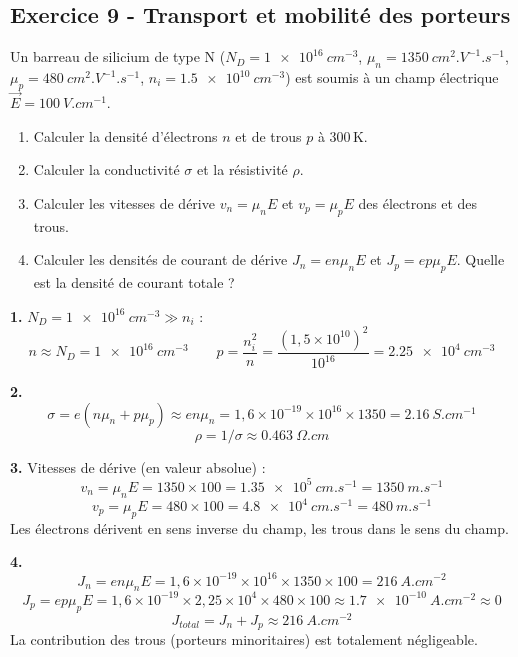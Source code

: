 \documentclass[12pt,a4paper]{article}
\begin{document}
\subsection*{Exercice 9 - Transport et mobilité des porteurs \niveau{\moyen}}

\begin{boiteexercice}
Un barreau de silicium de type N ($N_D = \qty{1e16}{cm^{-3}}$, $\mu_n = \qty{1350}{cm^2.V^{-1}.s^{-1}}$, $\mu_p = \qty{480}{cm^2.V^{-1}.s^{-1}}$, $n_i = \qty{1.5e10}{cm^{-3}}$) est soumis à un champ électrique $\vec{E} = \qty{100}{V.cm^{-1}}$.
\begin{enumerate}
  \item Calculer la densité d'électrons $n$ et de trous $p$ à 300\,K.
  \item Calculer la conductivité $\sigma$ et la résistivité $\rho$.
  \item Calculer les vitesses de dérive $v_n = \mu_n E$ et $v_p = \mu_p E$ des électrons et des trous.
  \item Calculer les densités de courant de dérive $J_n = en\mu_n E$ et $J_p = ep\mu_p E$. Quelle est la densité de courant totale ?
\end{enumerate}
\end{boiteexercice}

\begin{boitecorrige}
\textbf{1.} $N_D = \qty{1e16}{cm^{-3}} \gg n_i$ :
\[
n \approx N_D = \qty{1e16}{cm^{-3}} \qquad p = \frac{n_i^2}{n} = \frac{(1{,}5\times10^{10})^2}{10^{16}} = \qty{2.25e4}{cm^{-3}}
\]

\textbf{2.}
\[
\sigma = e(n\mu_n + p\mu_p) \approx en\mu_n = 1{,}6\times10^{-19}\times10^{16}\times1350 = \qty{2.16}{S.cm^{-1}}
\]
\[
\rho = 1/\sigma \approx \qty{0.463}{\Omega.cm}
\]

\textbf{3.} Vitesses de dérive (en valeur absolue) :
\[
v_n = \mu_n E = 1350\times100 = \qty{1.35e5}{cm.s^{-1}} = \qty{1350}{m.s^{-1}}
\]
\[
v_p = \mu_p E = 480\times100 = \qty{4.8e4}{cm.s^{-1}} = \qty{480}{m.s^{-1}}
\]
Les électrons dérivent en sens inverse du champ, les trous dans le sens du champ.

\textbf{4.}
\[
J_n = en\mu_n E = 1{,}6\times10^{-19}\times10^{16}\times1350\times100 = \qty{216}{A.cm^{-2}}
\]
\[
J_p = ep\mu_p E = 1{,}6\times10^{-19}\times2{,}25\times10^4\times480\times100 \approx \qty{1.7e-10}{A.cm^{-2}} \approx 0
\]
\[
J_{total} = J_n + J_p \approx \qty{216}{A.cm^{-2}}
\]
La contribution des trous (porteurs minoritaires) est totalement négligeable.
\end{boitecorrige}
\end{document}
